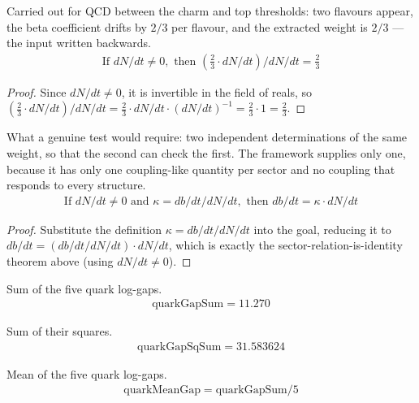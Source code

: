 \begin{theorem}
Carried out for QCD between the charm and top thresholds: two flavours appear, the beta coefficient drifts by $2/3$ per flavour, and the extracted weight is $2/3$ — the input written backwards.
\begin{align*}
\text{If } dN/dt \neq 0, \text{ then } \left(\frac{2}{3} \cdot dN/dt\right) / dN/dt = \frac{2}{3}
\end{align*}
\begin{proof}
Since $dN/dt\neq0$, it is invertible in the field of reals, so $(\tfrac23\cdot dN/dt)/dN/dt = \tfrac23\cdot dN/dt\cdot(dN/dt)^{-1} = \tfrac23\cdot1 = \tfrac23$.
\end{proof}
\end{theorem}

\begin{theorem}
What a genuine test would require: two independent determinations of the same weight, so that the second can check the first.  The framework supplies only one, because it has only one coupling-like quantity per sector and no coupling that responds to every structure.
\begin{align*}
\text{If } dN/dt \neq 0 \text{ and } \kappa = db/dt / dN/dt, \text{ then } db/dt = \kappa \cdot dN/dt
\end{align*}
\begin{proof}
Substitute the definition $\kappa = db/dt / dN/dt$ into the goal, reducing it to $db/dt = (db/dt / dN/dt)\cdot dN/dt$, which is exactly the sector-relation-is-identity theorem above (using $dN/dt\neq0$).
\end{proof}
\end{theorem}

\begin{definition}
Sum of the five quark log-gaps.
\begin{align*}
\text{quarkGapSum} = 11.270
\end{align*}
\end{definition}

\begin{definition}
Sum of their squares.
\begin{align*}
\text{quarkGapSqSum} = 31.583624
\end{align*}
\end{definition}

\begin{definition}
Mean of the five quark log-gaps.
\begin{align*}
\text{quarkMeanGap} = \text{quarkGapSum} / 5
\end{align*}
\end{definition}

